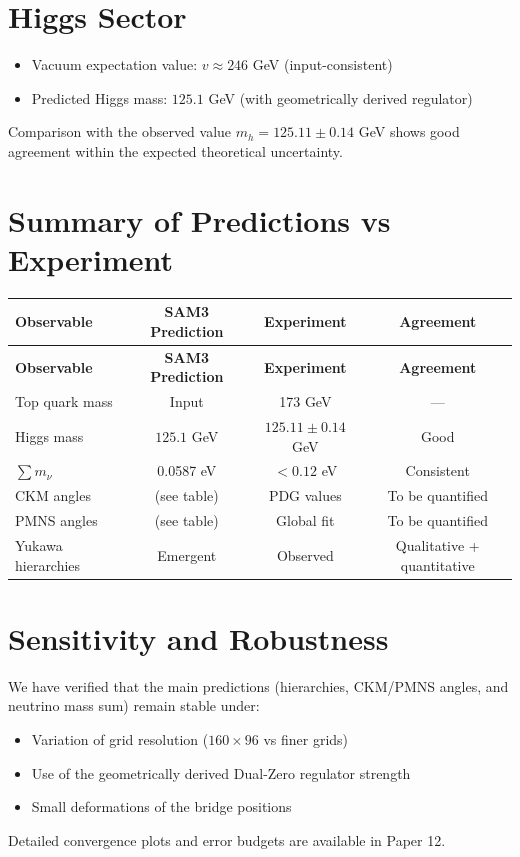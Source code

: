 \documentclass[11pt,a4paper]{article}
\begin{document}
\section{Higgs Sector}
\begin{itemize}
    \item Vacuum expectation value: \(v \approx 246\) GeV (input-consistent)
    \item Predicted Higgs mass: \(125.1\) GeV (with geometrically derived regulator)
\end{itemize}
Comparison with the observed value \(m_h = 125.11 \pm 0.14\) GeV shows good agreement within the expected theoretical uncertainty.

\section{Summary of Predictions vs Experiment}
\begin{center}
\begin{longtable}{l c c c}
\toprule
\textbf{Observable} & \textbf{SAM3 Prediction} & \textbf{Experiment} & \textbf{Agreement} \\
\midrule
\endfirsthead
\toprule
\textbf{Observable} & \textbf{SAM3 Prediction} & \textbf{Experiment} & \textbf{Agreement} \\
\midrule
\endhead
\bottomrule
\endfoot
Top quark mass & Input & 173 GeV & — \\
Higgs mass & \(125.1\) GeV & \(125.11 \pm 0.14\) GeV & Good \\
\(\sum m_\nu\) & 0.0587 eV & \(< 0.12\) eV & Consistent \\
CKM angles & (see table) & PDG values & To be quantified \\
PMNS angles & (see table) & Global fit & To be quantified \\
Yukawa hierarchies & Emergent & Observed & Qualitative + quantitative \\
\bottomrule
\end{longtable}
\end{center}

\section{Sensitivity and Robustness}
We have verified that the main predictions (hierarchies, CKM/PMNS angles, and neutrino mass sum) remain stable under:
\begin{itemize}
    \item Variation of grid resolution (\(160\times96\) vs finer grids)
    \item Use of the geometrically derived Dual-Zero regulator strength
    \item Small deformations of the bridge positions
\end{itemize}
Detailed convergence plots and error budgets are available in Paper 12.
\end{document}
